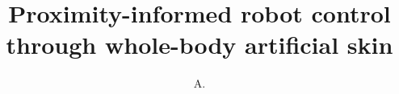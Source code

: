 \documentclass[defaultstyle,11pt]{thesis}
\title{Proximity-informed robot control through whole-body artificial skin}
\author{A.}{Aranburu Fernández}
\begin{document}






% 
% 

\nocite{*}		%

\appendix

% 
% 
\end{document}
